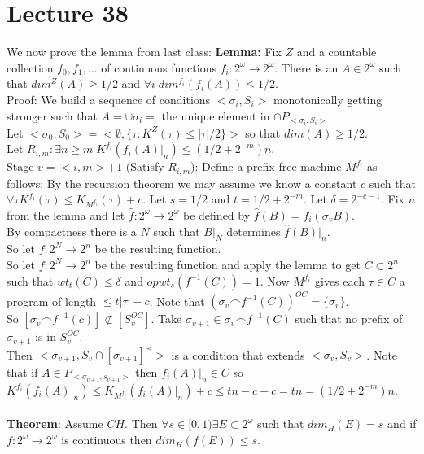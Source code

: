 \documentclass{article}
\begin{document}
   \section{Lecture 38}
   We now prove the lemma from last class:
   \textbf{Lemma:} Fix $Z$ and a countable collection $f_0,f_1,...$ of continuous functions $f_i : 2^\omega \to 2^\omega$. There is an $A \in 2^\omega$ such that $dim^Z(A) \geq 1/2$ and $\forall i\; dim^{f_i}(f_i(A)) \leq 1/2$. 
   \\Proof: We build a sequence of conditions $<\sigma_i,S_i>$ monotonically getting stronger such that $A = \cup \sigma_i = $ the unique element in $\cap P_{<\sigma_i,S_i>}$. \\
   Let $<\sigma_0,S_0 > = <\emptyset, \{\tau : K^Z(\tau) \leq |\tau|/2\}> $ so that $dim(A) \geq 1/2$.
   \\ Let $R_{i,m} : \exists n \geq m\; K^{f_i}(f_i(A)|_n) \leq (1/2 + 2^{-m})n$. \\
   Stage $v = <i,m>+1$ (Satisfy $R_{i,m}$): Define a prefix free machine $M^{f_i}$ as follows: By the recursion theorem we may assume we know a constant $c$ such that $\forall \tau K^{f_i}(\tau) \leq K_{M^{f_i}}(\tau) + c$. Let $s = 1/2$ and $t = 1/2 + 2^{-m}$. Let $\delta = 2^{-c-1}$. Fix $n$ from the lemma and let $\hat f: 2^\omega \to 2^\omega$ be defined by $\hat f(B) = f_i(\sigma_v B)$.\\
   By compactness there is a $N$ such that $B|_N$ determines $\hat f(B)|_n$.\\
   So let $f: 2^N \to 2^n$ be the resulting function. \\
   So let $f:2^N \to 2^n$ be the resulting function and apply the lemma to get $C \subset 2^n$ such that $wt_t(C) \leq \delta$ and $opwt_s(f^{-1}(C)) = 1$. Now $M^{f_i}$ gives each $\tau \in C$ a program of length $\leq t |\tau|-c$.
    Note that $(\sigma_v \frown f^{-1}(C))^{OC} = \{\sigma_v\}$.\\
   So $[\sigma_v \frown f^{-1}(c)] \not \subset [S_v^{OC}]$.
   Take $\sigma_{v+1} \in \sigma_v \frown f^{-1}(C)$ such that no prefix of $\sigma_{v+1}$ is in $S_v^{OC}$.\\
   Then $<\sigma_{v+1}, S_v \cap [\sigma_{v+1}]^\prec>$ is a condition that extends $<\sigma_v,S_v>$. Note that if $A \in P_{<\sigma_{v+1},s_{v+1}>}$ then $f_i(A)|_n \in C$ so $K^{f_i}(f_i(A)|_n) \leq K_{M^{f_i}}(f_i(A) |_n) + c \leq tn - c+ c = tn = (1/2 + 2^{-m})n$.\\\\
   \textbf{Theorem}:  Assume $CH$. Then $\forall s \in [0,1) \exists E \subset 2^\omega$ such that $dim_H(E) = s$ and if $f: 2^\omega \to 2^\omega$ is continuous then $dim_H(f(E)) \leq s$.\\
\end{document}
